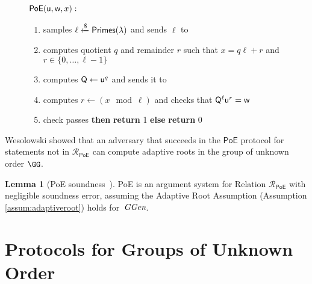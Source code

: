 \documentclass{article}
\theoremstyle{definition}
\newtheorem{lemma}{Lemma}
\begin{document}
\begin{figure}[!htp]
\noindent\begin{mdframed}[userdefinedwidth=\textwidth]
\begin{minipage}{\textwidth}
	\begin{flushleft}
	$\textsf{{PoE}}(\mathsf{u}, \mathsf{w}, x):$
	\begin{enumerate}[nolistsep]
		    \item \verifier samples $\ell \xleftarrow{\$} \textsf{Primes}(\lambda)$ and sends $\ell$ to \prover
		    \item \prover computes quotient $q$ and remainder $r$ such that $x = q\ell + r$ and $r \in \{0, \ldots, \ell-1\}$
		    \item \prover computes $\mathsf{Q} \gets \mathsf{u}^q$ and sends it to \verifier
		    \item \verifier computes $r \gets (x \mod \ell)$ and checks that $\mathsf{Q}^\ell\mathsf{u}^r = \mathsf{w}$
		    \item \pcif{}check passes \textbf{then} \textbf{return} 1 \textbf{else} \textbf{return} 0
		\end{enumerate}
	\end{flushleft}
\end{minipage}
\end{mdframed}
\end{figure}
Wesolowski showed that an adversary that succeeds in the $\textsf{PoE}$ protocol for statements not in $\mathcal{R}_{\textsf{PoE}}$ can compute adaptive roots in the group of unknown order $\GG$.

\begin{lemma}[\textsf{PoE} soundness~\cite{EC:Wesolowski19}]
\label{lem:poe}
\textsf{PoE} is an argument system for  Relation $\mathcal{R}_\textsf{PoE}$ with negligible soundness error,
assuming the Adaptive Root Assumption (Assumption \ref{assum:adaptiveroot}) holds for~$\textit{GGen}$.
\end{lemma}


\section{Protocols for Groups of Unknown Order}
\label{sec:protocol}
\end{document}
